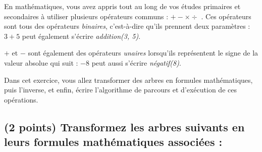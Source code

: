 \documentclass[11pt,a4paper]{article}
\begin{document}

\noindent En mathématiques, vous avez appris tout au long de vos études primaires et secondaires à utiliser plusieurs opérateurs communs : \og $ + - \times \div $ \fg{}.
Ces opérateurs sont tous des opérateurs \textit{binaires}, c'est-à-dire qu'ils prennent deux paramètres : \og $ 3 + 5 $ \fg{} peut également s'écrire \textit{addition(3, 5)}.

\noindent \og $ + $ \fg{} et \og $ - $ \fg{} sont également des opérateurs \textit{unaires} lorsqu'ils représentent le signe de la valeur absolue qui suit : \og $ - 8 $ \fg{} peut aussi s'écrire \textit{négatif(8)}.

\medskip

\noindent Dans cet exercice, vous allez transformer des arbres en formules mathématiques, puis l'inverse, et enfin, écrire l'algorithme de parcours et d'exécution de ces opérations.


\subsection{(2 points) Transformez les arbres suivants en leurs formules mathématiques associées : }
\end{document}
